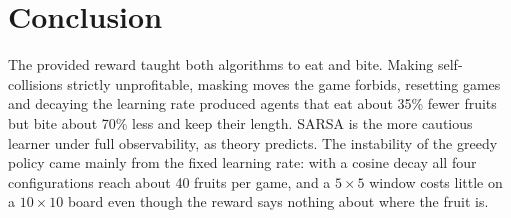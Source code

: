 \documentclass{article}
\begin{document}
\section{Conclusion}
\label{sec:conclusion}

The provided reward taught both algorithms to eat and bite. Making self-collisions strictly unprofitable, masking moves the game forbids, resetting games and decaying the learning rate produced agents that eat about 35\% fewer fruits but bite about 70\% less and keep their length.
SARSA is the more cautious learner under full observability, as theory predicts.
The instability of the greedy policy came mainly from the fixed learning rate: with a cosine decay all four configurations reach about 40 fruits per game, and a $5\times5$ window costs little on a $10\times10$ board even though the reward says nothing about where the fruit is.



\end{document}
